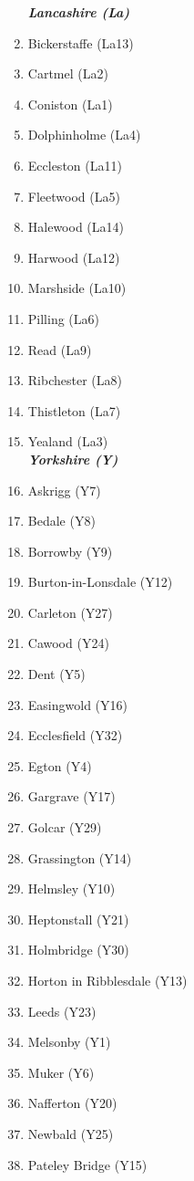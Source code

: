 \begin{refsection}
\begin{multicols}{2}
\begin{enumerate}
			\emph{\textbf{Lancashire (La)}}
			\item Bickerstaffe (La13)
			\item Cartmel (La2)
			\item Coniston (La1)
			\item Dolphinholme (La4)
			\item Eccleston (La11)
			\item Fleetwood (La5)
			\item Halewood (La14)
			\item Harwood (La12)
			\item Marshside (La10)
			\item Pilling (La6)
			\item Read (La9)
			\item Ribchester (La8)
			\item Thistleton (La7)
			\item Yealand (La3)\\
			\emph{\textbf{Yorkshire (Y)}}
			\item Askrigg (Y7)
			\item Bedale (Y8)
			\item Borrowby (Y9)
			\item Burton-in-Lonsdale (Y12)
			\item Carleton (Y27)
			\item Cawood (Y24)
			\item Dent (Y5)
			\item Easingwold (Y16)
			\item Ecclesfield (Y32)
			\item Egton (Y4)
			\item Gargrave (Y17)
			\item Golcar (Y29)
			\item Grassington (Y14)
			\item Helmsley (Y10)
			\item Heptonstall (Y21)
			\item Holmbridge (Y30)
			\item Horton in Ribblesdale (Y13)
			\item Leeds (Y23)
			\item Melsonby (Y1)
			\item Muker (Y6)
			\item Nafferton (Y20)
			\item Newbald (Y25)
			\item Pateley Bridge (Y15)

\end{enumerate}
\end{multicols}
\end{refsection}
